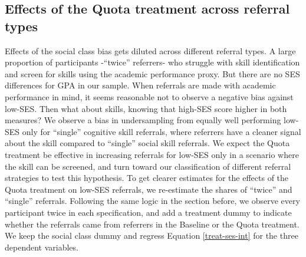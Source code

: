 \documentclass[11pt,a4paper,oneside]{article}
\begin{document}
  \subsection*{Effects of the Quota treatment across referral types}
  Effects of the social class bias gets diluted across different referral types. A large proportion of participants -``twice'' referrers- who struggle with skill identification and screen for skills using the academic performance proxy. But there are no SES differences for GPA in our sample. When referrals are made with academic performance in mind, it seems reasonable not to observe a negative bias against low-SES. Then what about skills, knowing that high-SES score higher in both measures? We observe a bias in undersampling from equally well performing low-SES only for ``single'' cognitive skill referrals, where referrers have a cleaner signal about the skill compared to ``single'' social skill referrals. We expect the Quota treatment be effective in increasing referrals for low-SES only in a scenario where the skill can be screened, and turn toward our classification of different referral strategies to test this hypothesis. To get clearer estimates for the effects of the Quota treatment on low-SES referrals, we re-estimate the shares of ``twice'' and ``single'' referrals. Following the same logic in the section before, we observe every participant twice in each specification, and add a treatment dummy to indicate whether the referrals came from referrers in the Baseline or the Quota treatment. We keep the social class dummy and regress Equation \ref{treat-ses-int} for the three dependent variables.
\end{document}

